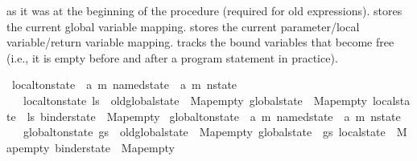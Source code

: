 \begin{isabellebody}
\begin{isamarkuptext}
as it was at the beginning of the procedure (required for old expressions).
 stores the current global variable mapping.
 stores the current parameter/local variable/return variable mapping.
 tracks the bound variables that become free (i.e., it is empty before and
after a program statement in practice).%
\end{isamarkuptext}\isamarkuptrue%
\isamarkupfalse%
\ local{\isacharunderscore}{\kern0pt}to{\isacharunderscore}{\kern0pt}nstate\ {\isacharcolon}{\kern0pt}{\isacharcolon}{\kern0pt}\ {\isachardoublequoteopen}{\isacharparenleft}{\kern0pt}{\isacharprime}{\kern0pt}a{\isacharcomma}{\kern0pt}\ {\isacharprime}{\kern0pt}m{\isacharparenright}{\kern0pt}\ named{\isacharunderscore}{\kern0pt}state\ {\isasymRightarrow}\ {\isacharparenleft}{\kern0pt}{\isacharprime}{\kern0pt}a{\isacharcomma}{\kern0pt}\ {\isacharprime}{\kern0pt}m{\isacharparenright}{\kern0pt}\ nstate{\isachardoublequoteclose}\isanewline
\ \ \ {\isachardoublequoteopen}local{\isacharunderscore}{\kern0pt}to{\isacharunderscore}{\kern0pt}nstate\ ls\ {\isacharequal}{\kern0pt}\ {\isasymlparr}old{\isacharunderscore}{\kern0pt}global{\isacharunderscore}{\kern0pt}state\ {\isacharequal}{\kern0pt}\ Map{\isachardot}{\kern0pt}empty{\isacharcomma}{\kern0pt}\ global{\isacharunderscore}{\kern0pt}state\ {\isacharequal}{\kern0pt}\ Map{\isachardot}{\kern0pt}empty{\isacharcomma}{\kern0pt}\ local{\isacharunderscore}{\kern0pt}state\ {\isacharequal}{\kern0pt}\ ls{\isacharcomma}{\kern0pt}\ binder{\isacharunderscore}{\kern0pt}state\ {\isacharequal}{\kern0pt}\ Map{\isachardot}{\kern0pt}empty{\isasymrparr}{\isachardoublequoteclose}\isanewline
\isanewline
{}\isamarkupfalse%
\ global{\isacharunderscore}{\kern0pt}to{\isacharunderscore}{\kern0pt}nstate\ {\isacharcolon}{\kern0pt}{\isacharcolon}{\kern0pt}\ {\isachardoublequoteopen}{\isacharparenleft}{\kern0pt}{\isacharprime}{\kern0pt}a{\isacharcomma}{\kern0pt}\ {\isacharprime}{\kern0pt}m{\isacharparenright}{\kern0pt}\ named{\isacharunderscore}{\kern0pt}state\ {\isacharequal}{\kern0pt}{\isachargreater}{\kern0pt}\ {\isacharparenleft}{\kern0pt}{\isacharprime}{\kern0pt}a{\isacharcomma}{\kern0pt}\ {\isacharprime}{\kern0pt}m{\isacharparenright}{\kern0pt}\ nstate{\isachardoublequoteclose}\isanewline
\ \ \ {\isachardoublequoteopen}global{\isacharunderscore}{\kern0pt}to{\isacharunderscore}{\kern0pt}nstate\ gs\ {\isacharequal}{\kern0pt}\ {\isasymlparr}old{\isacharunderscore}{\kern0pt}global{\isacharunderscore}{\kern0pt}state\ {\isacharequal}{\kern0pt}\ Map{\isachardot}{\kern0pt}empty{\isacharcomma}{\kern0pt}\ global{\isacharunderscore}{\kern0pt}state\ {\isacharequal}{\kern0pt}\ gs{\isacharcomma}{\kern0pt}\ local{\isacharunderscore}{\kern0pt}state\ {\isacharequal}{\kern0pt}\ Map{\isachardot}{\kern0pt}empty{\isacharcomma}{\kern0pt}\ binder{\isacharunderscore}{\kern0pt}state\ {\isacharequal}{\kern0pt}\ Map{\isachardot}{\kern0pt}empty{\isasymrparr}{\isachardoublequoteclose}%

\end{isabellebody}
